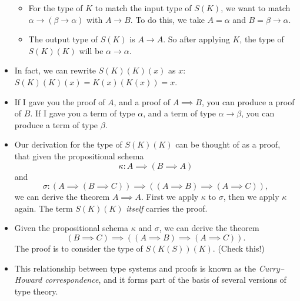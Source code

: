 \documentclass[11pt,paper=letter]{scrartcl}
\begin{document}
\begin{itemize}[leftmargin=*]
\begin{itemize}
\item For the type of $K$ to match the input type of $S(K)$, we want to match $\alpha \to (\beta \to \alpha)$ with $A \to B$. To do this, we take $A = \alpha$ and $B = \beta \to \alpha$.
\item The output type of $S(K)$ is $A \to A$. So after applying $K$, the type of $S(K)(K)$ will be $\alpha \to \alpha$.
\end{itemize}
\item In fact, we can rewrite $S(K)(K)(x)$ as $x$: $S(K)(K)(x) = K(x)(K(x)) = x$.
\item If I gave you the proof of $A$, and a proof of $A \implies B$, you can produce a proof of $B$. If I gave you a term of type $\alpha$, and a term of type $\alpha \to \beta$, you can produce a term of type $\beta$.
\item Our derivation for the type of $S(K)(K)$ can be thought of as a proof, that given the propositional schema \[
\kappa: A \implies (B \implies A)
\] and \[
\sigma: (A \implies (B \implies C)) \implies \left((A \implies B) \implies (A \implies C)\right),
\] we can derive the theorem $A \implies A$. First we apply $\kappa$ to $\sigma$, then we apply $\kappa$ again. The term $S(K)(K)$ \emph{itself} carries the proof.
\item Given the propositional schema $\kappa$ and $\sigma$, we can derive the theorem \[
(B \implies C) \implies \left( (A \implies B) \implies (A \implies C)\right).
\] The proof is to consider the type of $S(K(S))(K)$. (Check this!)
\item This relationship between type systems and proofs is known as the \emph{Curry--Howard correspondence}, and it forms part of the basis of several versions of type theory.
\end{itemize}
\end{document}
